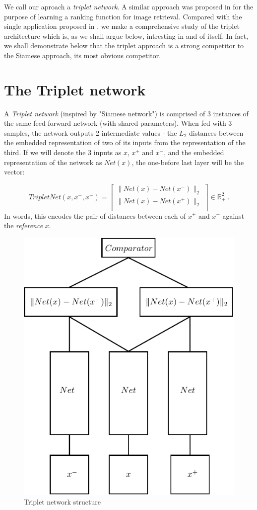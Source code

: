 \documentclass{article} %
\begin{document}
We call our aproach a \emph{triplet network}.
A similar approach  was proposed in  \cite{WangSLRWPCW2014} for the purpose of learning a ranking function for
image retrieval.  Compared with the single application proposed in  \cite{WangSLRWPCW2014}, we make a comprehensive
study of the  triplet architecture which is, as we shall argue below, intresting in and of itself.
In fact, we shall demonstrate below that the triplet approach  is a strong competitor to the Siamese approach, its
most obvious competitor.

\section{The Triplet network}
A \emph{Triplet network} (inspired by "Siamese network") is comprised of 3 instances of the same feed-forward network (with shared parameters).
When fed with 3 samples, the network
outputs 2 intermediate values - the $L_2$ distances between the embedded representation of two of its inputs from the representation of the third. 
If we will denote the 3 inputs as $x$, $x^{+}$ and $x^{-}$, and the
embedded representation of the network as $Net(x)$, the one-before last layer  will be the vector:

\begin{equation*}
    TripletNet(x,x^{-},x^{+})= \begin{bmatrix}
                       \|Net(x)-Net(x^{-})\|_2 \\[0.3em]
                      \|Net(x)-Net(x^{+})\|_2 \\

                      \end{bmatrix} \in \mathbb{R}_{+}^2\ .
\end{equation*}
In words, this encodes the pair of distances between each of $x^+$ and $x^-$ against the \emph{reference} $x$.
\begin{figure}[h]
\begin{center}
\includegraphics[width=0.5\linewidth]{TripletNet_scheme.pdf}
\end{center}
   \caption{Triplet network structure }\label{tripletnet_scheme}
\end{figure}
\end{document}
